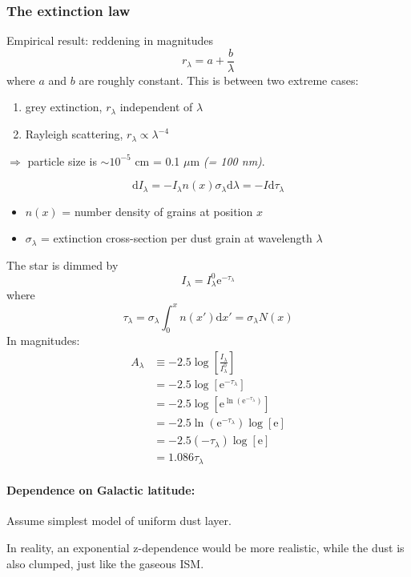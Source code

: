 \documentclass[11pt]{article}
\newcommand{\mar}[1]{\hspace{0pt}\marginpar{-\textcolor{black}{#1}-}}
\newcommand{\mynotes}[1]{{\fontfamily{cmss}\selectfont \textit{#1}}}
\begin{document}
\newpage
\subsubsection{The extinction law}
\mar{117}Empirical result: reddening in magnitudes
\[
    r_{\lambda} = a + \frac{b}{\lambda}
    \]
where $a$ and $b$ are roughly constant. This is between two extreme cases:
\begin{enumerate}
    \item grey extinction, $r_{\lambda}$ independent of $\lambda$
    \item Rayleigh scattering, $r_{\lambda} \propto \lambda^{-4}$
\end{enumerate}
$\Rightarrow$ particle size is $\sim 10^{-5}$ cm = 0.1 $\mu$m
\mynotes{(= 100 nm)}.

\[
    \mathrm{d}I_{\lambda}
    = -I_{\lambda}n(x)\sigma_{\lambda}\mathrm{d}\lambda
    = -I\mathrm{d}\tau_{\lambda}
    \]
\begin{itemize}
    \item $n(x)$ = number density of grains at position $x$
    \item $\sigma_{\lambda}$ = extinction cross-section per dust grain at
        wavelength $\lambda$
\end{itemize}
The star is dimmed by
\[
    I_{\lambda} = I_{\lambda} ^{0}\mathrm{e}^{-\tau_{\lambda} }
    \]
where
\[
    \tau_{\lambda}  = \sigma_{\lambda} \int_{0}^{x} {n(x')\mathrm{d}x'
    =\sigma_{\lambda}N(x) }
    \]
In magnitudes:
\begin{align*}
    A_{\lambda}
    &\equiv -2.5\log\left[ \frac{I_{\lambda} }{I_{\lambda}^{0}} \right]\\
    &= -2.5\log\left[ \mathrm{e}^{-\tau_{\lambda}} \right]\\
    &= -2.5\log\left[\mathrm{e}^{\ln(\mathrm{e}^{-\tau_{\lambda}}) }\right]\\
    &= -2.5\ln(\mathrm{e}^{-\tau_{\lambda}}) \log\left[\mathrm{e} \right]\\
    &= -2.5 (-\tau_{\lambda}) \log\left[\mathrm{e} \right]\\
    &= 1.086\tau_{\lambda}
\end{align*}

\paragraph{Dependence on Galactic latitude:}
Assume simplest model of uniform dust layer.

\mar{118}In reality, an exponential z-dependence would be more realistic,
while the dust is also clumped, just like the gaseous ISM.
\end{document}

